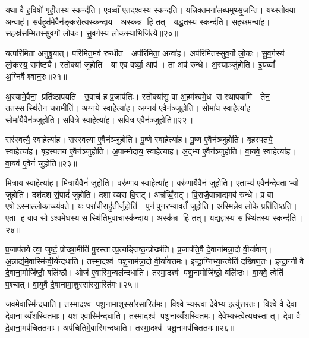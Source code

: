 यथा॒ वै ह॒विषो॑ गृही॒तस्य॒ स्कन्द॑ति। ए॒वव्वाँ ए॒तदश्व॑स्य स्कन्दति। यन्नि॒क्तमना॑लब्धमुथ्सृ॒जन्ति॑। यथ्स्तोक्या॑ अ॒न्वाह॑। स॒र्व॒हुत॑मे॒वैन॑ङ्करो॒त्यस्क॑न्दाय। अस्क॑न्न॒ हि तत्। यद्धु॒तस्य॒ स्कन्द॑ति। स॒हस्र॒मन्वा॑ह। स॒हस्र॑सम्मितस्सुव॒र्गो लो॒कः। सु॒व॒र्गस्य॑ लो॒कस्या॒भिजि॑त्यै॥२०॥

यत्परि॑मिता अनुब्रू॒यात्। परि॑मित॒मव॑ रुन्धीत। अप॑रिमिता॒ अन्वा॑ह। अप॑रिमितस्सुव॒र्गो लो॒कः। सु॒व॒र्गस्य॑ लो॒कस्य॒ सम॑ष्ट्यै। स्तोक्या॑ जुहोति। या ए॒व वर्ष्या॒ आप॑। ता अव॑ रुन्धे। अ॒स्याञ्जु॑होति। इ॒यव्वाँ अ॒ग्निर्वैश्वान॒रः॥२१॥

अ॒स्यामे॒वैना॒ प्रति॑ष्ठापयति। उ॒वाच॑ ह प्र॒जाप॑तिः। स्तोक्या॑सु॒ वा अ॒हम॑श्वमे॒ध सस्था॑पयामि। तेन॒ तत॒स्सस्थि॑तेन चरा॒मीति॑। अ॒ग्नये॒ स्वाहेत्या॑ह। अ॒ग्नय॑ ए॒वैन॑ञ्जुहोति। सोमा॑य॒ स्वाहेत्या॑ह। सोमा॑यै॒वैन॑ञ्जुहोति। स॒वि॒त्रे स्वाहेत्या॑ह। स॒वि॒त्र ए॒वैन॑ञ्जुहोति॥२२॥

सर॑स्वत्यै॒ स्वाहेत्या॑ह। सर॑स्वत्या ए॒वैन॑ञ्जुहोति। पू॒ष्णे स्वाहेत्या॑ह। पू॒ष्ण ए॒वैन॑ञ्जुहोति। बृह॒स्पत॑ये॒ स्वाहेत्या॑ह। बृह॒स्पत॑य ए॒वैन॑ञ्जुहोति। अ॒पाम्मोदा॑य॒ स्वाहेत्या॑ह। अ॒द्भ्य ए॒वैन॑ञ्जुहोति। वा॒यवे॒ स्वाहेत्या॑ह। वा॒यव॑ ए॒वैनं॑ जुहोति॥२३॥

मि॒त्राय॒ स्वाहेत्या॑ह। मि॒त्रायै॒वैनं॑ जुहोति। वरु॑णाय॒ स्वाहेत्या॑ह। वरु॑णायै॒वैनं॑ जुहोति। ए॒ताभ्य॑ ए॒वैन॑न्दे॒वताभ्यो जुहोति। दश॑दश सं॒पादं॑ जुहोति। दशाख्षरा वि॒राट्। अन्न॑व्विँ॒राट्। वि॒राजै॒वान्नाद्य॒मव॑ रुन्धे। प्र वा ए॒षोऽस्माल्लो॒काच्च्य॑वते। यः परा॑ची॒राहु॑तीर्जु॒होति॑। पुन॑पुनरभ्या॒वर्तं॑ जुहोति। अ॒स्मिन्ने॒व लो॒के प्रति॑तिष्ठति। ए॒ता ह वाव सोऽश्वमे॒धस्य॒ सस्थि॑तिमुवा॒चास्क॑न्दाय। अस्क॑न्न॒ हि तत्। यद्य॒ज्ञस्य॒ सस्थि॑तस्य॒ स्कन्द॑ति॥२४॥\anuvakamend[अ॒भिजि॑त्यै वैश्वान॒रस्स॑वि॒त्र ए॒वैनं॑ जुहोति वा॒यव॑ ए॒वैनं॑ जुहोति च्यवते॒ षट् च॑]

प्र॒जाप॑तये त्वा॒ जुष्टं॒ प्रोख्षा॒मीति॑ पु॒रस्तात्प्र॒त्यङ्तिष्ठ॒न्प्रोख्ष॑ति। प्र॒जाप॑ति॒र्वै दे॒वाना॑मन्ना॒दो वी॒र्या॑वान्। अ॒न्नाद्य॑मे॒वास्मि॑न्वी॒र्य॑न्दधाति। तस्मा॒दश्व॑ पशू॒नाम॑न्ना॒दो वी॒र्या॑वत्तमः। इ॒न्द्रा॒ग्निभ्या॒न्त्वेति॑ दख्षिण॒तः। इ॒न्द्रा॒ग्नी वै दे॒वाना॒मोजि॑ष्ठौ॒ बलि॑ष्ठौ। ओज॑ ए॒वास्मि॒न्बल॑न्दधाति। तस्मा॒दश्व॑ पशू॒नामोजि॑ष्ठो॒ बलि॑ष्ठः। वा॒यवे॒ त्वेति॑ प॒श्चात्। वा॒युर्वै दे॒वाना॑मा॒शुस्सा॑रसा॒रित॑मः॥२५॥

ज॒वमे॒वास्मि॑न्दधाति। तस्मा॒दश्व॑ पशू॒नामा॒शुस्सा॑रसा॒रित॑मः। विश्वेभ्यस्त्वा दे॒वेभ्य॒ इत्यु॑त्तर॒तः। विश्वे॒ वै दे॒वा दे॒वानाय्यँश॒स्वित॑माः। यश॑ ए॒वास्मि॑न्दधाति। तस्मा॒दश्व॑ पशू॒नाय्यँ॑श॒स्वित॑मः। दे॒वेभ्य॒स्त्वेत्य॒धस्तात्। दे॒वा वै दे॒वाना॒मप॑चिततमाः। अप॑चितिमे॒वास्मि॑न्दधाति। तस्मा॒दश्व॑ पशू॒नामप॑चिततमः॥२६॥

